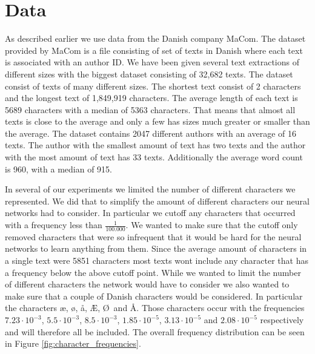 \section{Data} \label{sec:data}

As described earlier we use data from the Danish company MaCom. The dataset
provided by MaCom is a file consisting of set of texts in Danish where each text
is associated with an author ID. We have been given several text extractions
of different sizes with the biggest dataset consisting of 32,682 texts. The
dataset consist of texts of many different sizes. The shortest text consist of 2
characters and the longest text of 1,849,919 characters. The average length of
each text is 5689 characters with a median of 5363 characters. That means that
almost all texts is close to the average and only a few has sizes much greater
or smaller than the average. The dataset contains 2047 different authors with
an average of 16 texts. The author with the smallest amount of text has two
texts and the author with the most amount of text has 33 texts. Additionally the
average word count is 960, with a median of 915.

In several of our experiments we limited the number of different characters
we represented. We did that to simplify the amount of different characters
our neural networks had to consider. In particular we cutoff any characters
that occurred with a frequency less than $\frac{1}{100.000}$. We wanted to
make sure that the cutoff only removed characters that were so infrequent that
it would be hard for the neural networks to learn anything from them. Since
the average amount of characters in a single text were 5851 characters most
texts wont include any character that has a frequency below the above cutoff
point. While we wanted to limit the number of different characters the network
would have to consider we also wanted to make sure that a couple of Danish
characters would be considered. In particular the characters \ae, \o, \aa, \AE,
\O\ and \AA. Those characters occur with the frequencies $7.23\cdot10^{-3}$,
$5.5\cdot10^{-3}$, $8.5\cdot10^{-3}$, $1.85\cdot10^{-5}$, $3.13\cdot10^{-5}$ and
$2.08\cdot10^{-5}$ respectively and will therefore all be included. The overall
frequency distribution can be seen in Figure \ref{fig:character_frequencies}.

